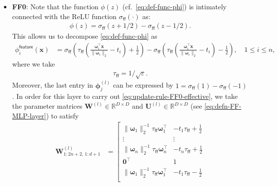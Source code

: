 \documentclass[english]{article}
\begin{document}


\begin{itemize}
\item \textbf{FF0}:
Note that the function $\phi(z)$ (cf.~\eqref{eq:def-func-phi}) is intimately connected with the ReLU function $\sigma_{\mathsf{ff}}(\cdot)$ as:
%
\begin{align}
\phi(z) = \sigma_{\mathsf{ff}}(z+1/2) - \sigma_{\mathsf{ff}}(z-1/2).
\end{align}
%
This allows us to decompose \eqref{eq:def-func-phi} as
%
\begin{align}
\phi_i^{\mathsf{feature}}({\bm x}) 
&= \sigma_{\mathsf{ff}}\left(\tau_{\mathsf{ff}}\left(\frac{{\bm \omega}_i^{\top}{\bm x}}{\|{\bm \omega}_i\|_2} - t_i\right)+\frac12\right) - \sigma_{\mathsf{ff}}\left(\tau_{\mathsf{ff}}\left(\frac{{\bm \omega}_i^{\top}{\bm x}}{\|{\bm \omega}_i\|_2} - t_i\right)-\frac12\right)  ,\quad 1\le i\le n,\label{eq:decomp-phi-feature}
\end{align}
where we take
\begin{align}
\tau_{\mathsf{ff}} = 1/\sqrt{\varepsilon}.
\end{align}
Moreover, the last entry in ${\bm \phi}_j^{(l)}$ can be expressed by $1 = \sigma_{\mathsf{ff}}(1) - \sigma_{\mathsf{ff}}(-1)$. 
In order for this layer to carry out \eqref{eq:update-rule-FF0-effective}, we take the parameter matrices ${\bm W}^{(l)}\in\mathbb{R}^{D\times D}$ and ${\bm U}^{(l)}\in\mathbb{R}^{D\times D}$ (see \eqref{eq:defn-FF-MLP-layer}) to satisfy
%
\begin{subequations}
\begin{align}
{\bm W}_{1:2n+2,\,1:d+1}^{(l)} &= \left[
\begin{array}{cc}
\|{\bm \omega}_1\|_2^{-1}\tau_\mathsf{ff}{\bm \omega}_1^{\top} & -t_1\tau_\mathsf{ff} + \frac12\\
\vdots & \vdots \\
\|{\bm \omega}_n\|_2^{-1}\tau_\mathsf{ff}{\bm \omega}_n^{\top} & -t_n\tau_\mathsf{ff} + \frac12\\
{\bm 0}^{\top} & 1\\
\|{\bm \omega}_1\|_2^{-1}\tau_\mathsf{ff}{\bm \omega}_1^{\top} & -t_1\tau_\mathsf{ff} - \frac12\\

\end{array}
\end{align}
\end{subequations}
\end{itemize}
\end{document}
